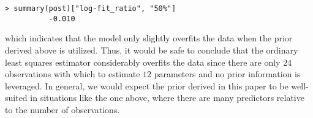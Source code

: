 \documentclass[11pt]{article}
\begin{document}
\begin{lstlisting}
> summary(post)["log-fit_ratio", "50%"]
          -0.010
\end{lstlisting}

which indicates that the model only slightly overfits the data when the prior
derived above is utilized. Thus, it would be safe to conclude that the ordinary
least squares estimator considerably overfits the data since there are only $24$
observations with which to estimate $12$ parameters and no prior information is
leveraged. In general, we would expect the prior derived in this paper to be
well-suited in situations like the one above, where there are many predictors
relative to the number of observations.



\end{document}
